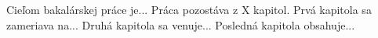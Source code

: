 Cieľom bakalárskej práce je... Práca pozostáva z X kapitol. Prvá kapitola sa zameriava na... 
Druhá kapitola sa venuje... Posledná kapitola obsahuje... 